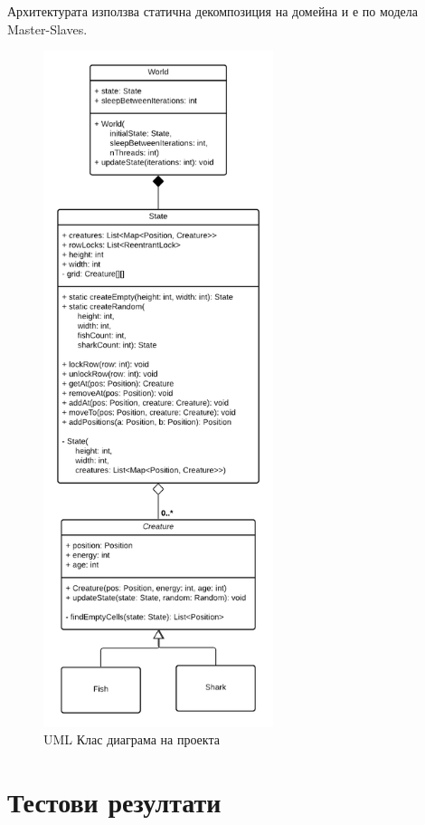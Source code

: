 \documentclass{article}
\begin{document}
Архитектурата използва статична декомпозиция на домейна и е по модела Master-Slaves.

\begin{figure}[H]
	\centering
	\includegraphics[width=0.6\textwidth]{classes-uml.png}
	\caption{UML Клас диаграма на проекта}
	\label{fig:figure1}
\end{figure}

\section{Тестови резултати}
\end{document}
